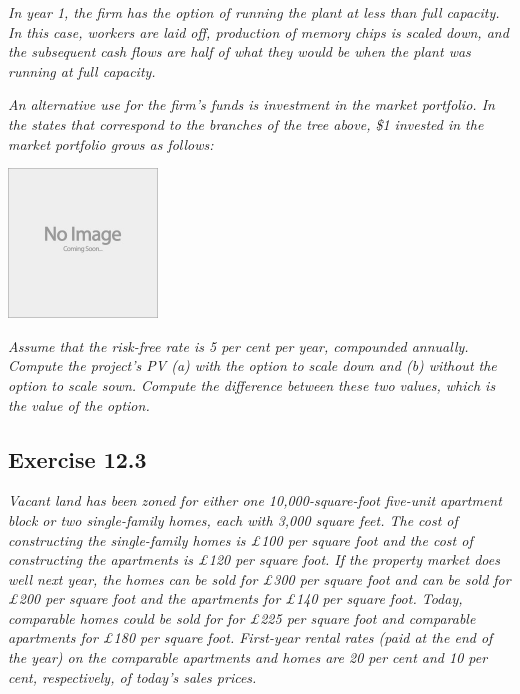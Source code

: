 \documentclass[]{book}
\theoremstyle{definition}
\theoremstyle{definition}
\theoremstyle{remark}
\begin{document}
\emph{In year 1, the firm has the option of running the plant at less
than full capacity. In this case, workers are laid off, production of
memory chips is scaled down, and the subsequent cash flows are half of
what they would be when the plant was running at full capacity.}
\citep[p.424]{book}

\emph{An alternative use for the firm's funds is investment in the
market portfolio. In the states that correspond to the branches of the
tree above, \$1 invested in the market portfolio grows as follows:}
\citep[p.424]{book}

\begin{center}\includegraphics[width=150px]{figures/placeholder} \end{center}

\emph{Assume that the risk-free rate is 5 per cent per year, compounded
annually. Compute the project's PV (a) with the option to scale down and
(b) without the option to scale sown. Compute the difference between
these two values, which is the value of the option.} \citep[p.425]{book}

\subsection{Exercise 12.3}\label{exercise-12.3}

\emph{Vacant land has been zoned for either one 10,000-square-foot
five-unit apartment block or two single-family homes, each with 3,000
square feet. The cost of constructing the single-family homes is £100
per square foot and the cost of constructing the apartments is £120 per
square foot. If the property market does well next year, the homes can
be sold for £300 per square foot and can be sold for £200 per square
foot and the apartments for £140 per square foot. Today, comparable
homes could be sold for for £225 per square foot and comparable
apartments for £180 per square foot. First-year rental rates (paid at
the end of the year) on the comparable apartments and homes are 20 per
cent and 10 per cent, respectively, of today's sales prices.}
\citep[p.425]{book}
\end{document}
